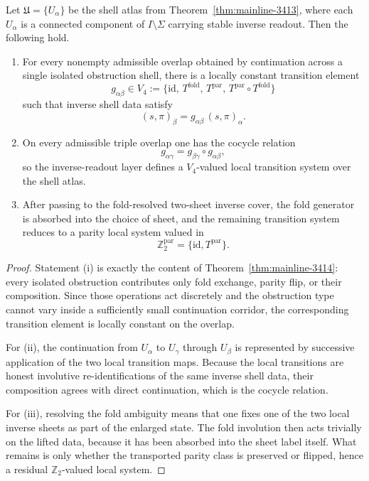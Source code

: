 \begin{theorem}
\label{thm:mainline-3415}
Let $\mathfrak U=\{U_\alpha\}$ be the shell atlas from Theorem~\ref{thm:mainline-3413}, where each $U_\alpha$ is a connected component of $I\setminus\Sigma$ carrying stable inverse readout. Then the following hold.
\begin{enumerate}[label=(\roman*)]
  \item For every nonempty admissible overlap obtained by continuation across a single isolated obstruction shell, there is a locally constant transition element
  \[
    g_{\alpha\beta}\in V_4:=\{\mathrm{id},\,T^{\mathrm{fold}},\,T^{\mathrm{par}},\,T^{\mathrm{par}}\circ T^{\mathrm{fold}}\}
  \]
  such that inverse shell data satisfy
  \[
    (s,\pi)_\beta = g_{\alpha\beta}\,(s,\pi)_\alpha.
  \]
  \item On every admissible triple overlap one has the cocycle relation
  \[
    g_{\alpha\gamma}=g_{\beta\gamma}\circ g_{\alpha\beta},
  \]
  so the inverse-readout layer defines a $V_4$-valued local transition system over the shell atlas.
  \item After passing to the fold-resolved two-sheet inverse cover, the fold generator is absorbed into the choice of sheet, and the remaining transition system reduces to a parity local system valued in
  \[
    \mathbb Z_2^{\mathrm{par}}=\{\mathrm{id},T^{\mathrm{par}}\}.
  \]
\end{enumerate}
\end{theorem}

\begin{proof}
Statement (i) is exactly the content of Theorem~\ref{thm:mainline-3414}: every isolated obstruction contributes only fold exchange, parity flip, or their composition. Since those operations act discretely and the obstruction type cannot vary inside a sufficiently small continuation corridor, the corresponding transition element is locally constant on the overlap.

For (ii), the continuation from $U_\alpha$ to $U_\gamma$ through $U_\beta$ is represented by successive application of the two local transition maps. Because the local transitions are honest involutive re-identifications of the same inverse shell data, their composition agrees with direct continuation, which is the cocycle relation.

For (iii), resolving the fold ambiguity means that one fixes one of the two local inverse sheets as part of the enlarged state. The fold involution then acts trivially on the lifted data, because it has been absorbed into the sheet label itself. What remains is only whether the transported parity class is preserved or flipped, hence a residual $\mathbb Z_2$-valued local system.
\end{proof}

